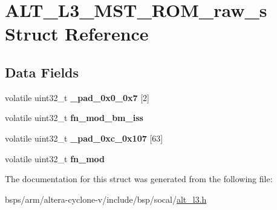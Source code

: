 \hypertarget{structALT__L3__MST__ROM__raw__s}{}\section{A\+L\+T\+\_\+\+L3\+\_\+\+M\+S\+T\+\_\+\+R\+O\+M\+\_\+raw\+\_\+s Struct Reference}
\label{structALT__L3__MST__ROM__raw__s}
\subsection*{Data Fields}
\begin{DoxyCompactItemize}
\item 
\mbox{\label{structALT__L3__MST__ROM__raw__s_a4037b3f733a5741f856791113bb282f7}} 
volatile uint32\+\_\+t {\bfseries \+\_\+pad\+\_\+0x0\+\_\+0x7} \mbox{[}2\mbox{]}
\item 
\mbox{\label{structALT__L3__MST__ROM__raw__s_ac41b2f47496bb36a92f84beea4c4306e}} 
volatile uint32\+\_\+t {\bfseries fn\+\_\+mod\+\_\+bm\+\_\+iss}
\item 
\mbox{\label{structALT__L3__MST__ROM__raw__s_ae4ed7f03ec0b392f8dd8ff66e526f088}} 
volatile uint32\+\_\+t {\bfseries \+\_\+pad\+\_\+0xc\+\_\+0x107} \mbox{[}63\mbox{]}
\item 
\mbox{\label{structALT__L3__MST__ROM__raw__s_a940e5ef5f6da643bd6e84aa84cdbf353}} 
volatile uint32\+\_\+t {\bfseries fn\+\_\+mod}
\end{DoxyCompactItemize}


The documentation for this struct was generated from the following file\+:\begin{DoxyCompactItemize}
\item 
bsps/arm/altera-\/cyclone-\/v/include/bsp/socal/\mbox{\hyperlink{alt__l3_8h}{alt\+\_\+l3.\+h}}\end{DoxyCompactItemize}
